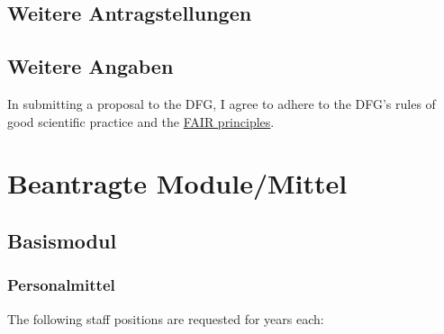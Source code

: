 \documentclass{scrartcl}
\begin{document}
\subsection{Weitere Antragstellungen}

\subsection{Weitere Angaben}
In submitting a proposal to the DFG, I agree to adhere to the DFG's rules of good scientific practice and the \href{https://www.nature.com/articles/sdata201618}{FAIR principles}.


\section{Beantragte Module/Mittel}

\subsection{Basismodul}

\subsubsection{Personalmittel}
\begin{funds}
The following staff positions are requested for  years each:


\end{funds}
\end{document}
